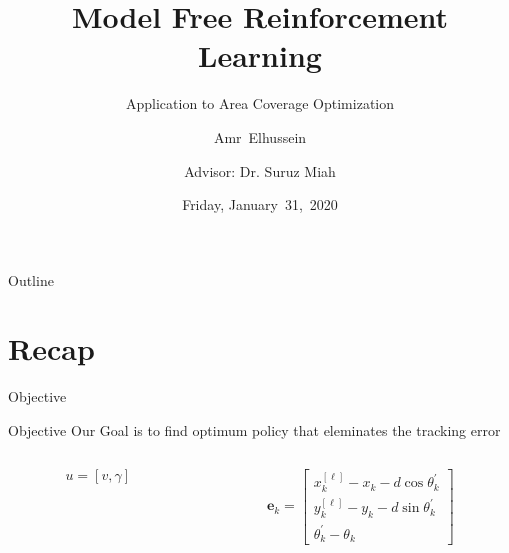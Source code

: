 \documentclass{beamer}
\title{Model Free Reinforcement Learning}
\subtitle{Application to Area Coverage Optimization}
\author[A.Elhussein]{Amr~Elhussein  \\\and
Advisor: Dr. Suruz Miah}
\institute[Bradley University] %
{
  Department of Electrical and Computer Engineering\\
  Bradley University\\
  1501 W. Bradley Avenue\\
  Peoria, IL, 61625, USA
}
\date[January~31,~2020]{Friday, January~31,~2020}
\begin{document}
\begin{frame}
  \titlepage
\end{frame}

\begin{frame}{Outline}
  \tableofcontents
\end{frame}


\section{Recap}
\begin{frame}{Objective}
\begin{block}{Objective}
Our Goal is to find optimum policy that eleminates the tracking error
\end{block}
\begin{columns}
\begin{column}{0.5\textwidth}
\begin{equation}
u = \left[v, \gamma\right]
\end{equation}
\end{column}
\begin{column}{0.5\textwidth}
\begin{equation}
\mathbf{e}_k = \begin{bmatrix}
     x_k^{[\ell]} - x_k - d\cos\theta_k^{'}
    \\ y_k^{[\ell]} - y_k - d\sin\theta_k^{'}
    \\ \theta_k^{'} - \theta_k
  \end{bmatrix}
\end{equation} 
\end{column}
\end{columns}
\end{frame}
\end{document}
